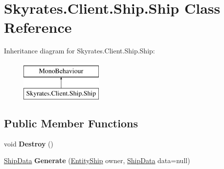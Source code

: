 \hypertarget{class_skyrates_1_1_client_1_1_ship_1_1_ship}{\section{Skyrates.\-Client.\-Ship.\-Ship Class Reference}
\label{class_skyrates_1_1_client_1_1_ship_1_1_ship}
}
Inheritance diagram for Skyrates.\-Client.\-Ship.\-Ship\-:\begin{figure}[H]
\begin{center}
\leavevmode
\includegraphics[height=2.000000cm]{class_skyrates_1_1_client_1_1_ship_1_1_ship}
\end{center}
\end{figure}
\subsection*{Public Member Functions}
\begin{DoxyCompactItemize}
\item 
\hypertarget{class_skyrates_1_1_client_1_1_ship_1_1_ship_a0e10ad8211decc8c7bbb4c9ff49c3e17}{void {\bfseries Destroy} ()}\label{class_skyrates_1_1_client_1_1_ship_1_1_ship_a0e10ad8211decc8c7bbb4c9ff49c3e17}

\item 
\hypertarget{class_skyrates_1_1_client_1_1_ship_1_1_ship_a3a126b748f8c3265ab2d054c8c11ded7}{\hyperlink{class_ship_data}{Ship\-Data} {\bfseries Generate} (\hyperlink{class_skyrates_1_1_client_1_1_entity_1_1_entity_ship}{Entity\-Ship} owner, \hyperlink{class_ship_data}{Ship\-Data} data=null)}\label{class_skyrates_1_1_client_1_1_ship_1_1_ship_a3a126b748f8c3265ab2d054c8c11ded7}

\end{DoxyCompactItemize}

